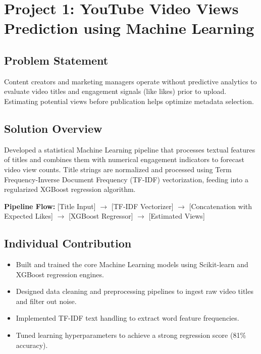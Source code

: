 \documentclass[11pt,letterpaper]{article}
\begin{document}
\newpage

\section{Project 1: YouTube Video Views Prediction using Machine Learning}

\subsection{Problem Statement}
Content creators and marketing managers operate without predictive analytics to evaluate video titles and engagement signals (like likes) prior to upload. Estimating potential views before publication helps optimize metadata selection.

\subsection{Solution Overview}
Developed a statistical Machine Learning pipeline that processes textual features of titles and combines them with numerical engagement indicators to forecast video view counts. Title strings are normalized and processed using Term Frequency-Inverse Document Frequency (TF-IDF) vectorization, feeding into a regularized XGBoost regression algorithm.

\begin{center}
    \small
    \textbf{Pipeline Flow:} [Title Input] $\rightarrow$ [TF-IDF Vectorizer] $\rightarrow$ [Concatenation with Expected Likes] $\rightarrow$ [XGBoost Regressor] $\rightarrow$ [Estimated Views]
\end{center}

\subsection{Individual Contribution}
\begin{itemize}
    \item Built and trained the core Machine Learning models using Scikit-learn and XGBoost regression engines.
    \item Designed data cleaning and preprocessing pipelines to ingest raw video titles and filter out noise.
    \item Implemented TF-IDF text handling to extract word feature frequencies.
    \item Tuned learning hyperparameters to achieve a strong regression score (81\% accuracy).
\end{itemize}
\end{document}
